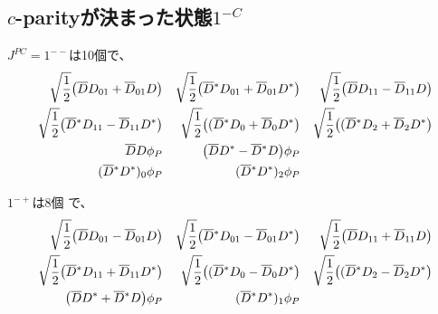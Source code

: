 \documentclass[a4j]{jarticle}
\def\Dbar{\overline{{D}}{}}
\begin{document}
\begin{landscape}
\begin{table}
\label{tbl:1f}
\end{table}%
\end{landscape}

\subsection{$c$-parityが決まった状態$1^{-C}$}

$J^{PC}=1^{--}$は10個で、
\begin{align}
\sqrt{1\over 2}\big( \Dbar   D_{01}+\Dbar_{01} D \big)
 &&
\sqrt{1\over 2}\big(\Dbar^* D_{01}+\Dbar_{01} D^*\big)
&&
\sqrt{1\over 2}\big(\Dbar   D_{11}-\Dbar_{11} D\big)
\\
\sqrt{1\over 2}\big(\Dbar^* D_{11}-\Dbar_{11} D^*\big)
&&
\sqrt{1\over 2}\big((\Dbar^* D_{0}+\Dbar_{0}  D^*\big)
&&
\sqrt{1\over 2}\big((\Dbar^* D_{2}+\Dbar_{2}  D^*\big)
\\
\Dbar   D\phi_P
&&
\big(\Dbar   D^*-\Dbar^* D\big)\phi_P
\\
(\Dbar^* D^*)_0\phi_P
&&
(\Dbar^* D^*)_2 \phi_P
\end{align}


$1^{-+}$は8個
で、
\begin{align}
\sqrt{1\over 2}\big( \Dbar   D_{01}-\Dbar_{01} D \big)
 &&
\sqrt{1\over 2}\big(\Dbar^* D_{01}-\Dbar_{01} D^*\big)
&&
\sqrt{1\over 2}\big(\Dbar   D_{11}+\Dbar_{11} D\big)
\\
\sqrt{1\over 2}\big(\Dbar^* D_{11}+\Dbar_{11} D^*\big)
&&
\sqrt{1\over 2}\big((\Dbar^* D_{0}-\Dbar_{0}  D^*\big)
&&
\sqrt{1\over 2}\big((\Dbar^* D_{2}-\Dbar_{2}  D^*\big)
\\
\big(\Dbar   D^*+\Dbar^* D\big)\phi_P
&&
(\Dbar^* D^*)_1\phi_P
\end{align}
\end{document}
